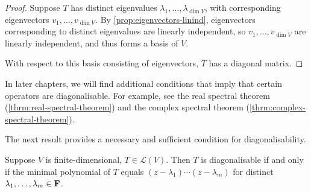 \begin{proof}
Suppose $T$ has distinct eigenvalues $\lambda_1,\dots,\lambda_{\dim V}$, with corresponding eigenvectors $v_1,\dots,v_{\dim V}$. By \ref{prop:eigenvectors-linind}, eigenvectors corresponding to distinct eigenvalues are linearly independent, so $v_1,\dots,v_{\dim V}$ are linearly independent, and thus forms a basis of $V$.

With respect to this basis consisting of eigenvectors, $T$ has a diagonal matrix.
\end{proof}

In later chapters, we will find additional conditions that imply that certain operators are diagonalisable. For example, see the real spectral theorem (\ref{thrm:real-spectral-theorem}) and the complex spectral theorem (\ref{thrm:complex-spectral-theorem}).

The next result provides a necessary and sufficient condition for diagonalisability.

\begin{theorem}\label{thrm:diagonalisability-minimal-polynomial}
Suppose $V$ is finite-dimensional, $T\in\mathcal{L}(V)$. Then $T$ is diagonalisable if and only if the minimal polynomial of $T$ equals $(z-\lambda_1)\cdots(z-\lambda_m)$ for distinct $\lambda_1,\dots,\lambda_m\in\mathbf F$.
\end{theorem}

